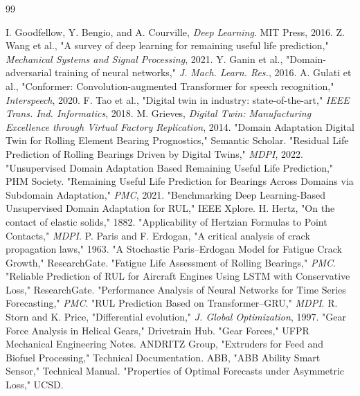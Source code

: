 \documentclass[journal,10pt,a4paper]{IEEEtran}
\begin{document}
\begin{thebibliography}{99}

 I. Goodfellow, Y. Bengio, and A. Courville, \emph{Deep Learning}. MIT Press, 2016.
 Z. Wang et al., "A survey of deep learning for remaining useful life prediction," \emph{Mechanical Systems and Signal Processing}, 2021.
 Y. Ganin et al., "Domain-adversarial training of neural networks," \emph{J. Mach. Learn. Res.}, 2016.
 A. Gulati et al., "Conformer: Convolution-augmented Transformer for speech recognition," \emph{Interspeech}, 2020.
 F. Tao et al., "Digital twin in industry: state-of-the-art," \emph{IEEE Trans. Ind. Informatics}, 2018.
 M. Grieves, \emph{Digital Twin: Manufacturing Excellence through Virtual Factory Replication}, 2014.
 "Domain Adaptation Digital Twin for Rolling Element Bearing Prognostics," Semantic Scholar.
 "Residual Life Prediction of Rolling Bearings Driven by Digital Twins," \emph{MDPI}, 2022.
 "Unsupervised Domain Adaptation Based Remaining Useful Life Prediction," PHM Society.
 "Remaining Useful Life Prediction for Bearings Across Domains via Subdomain Adaptation," \emph{PMC}, 2021.
 "Benchmarking Deep Learning-Based Unsupervised Domain Adaptation for RUL," IEEE Xplore.
 H. Hertz, "On the contact of elastic solids," 1882.
 "Applicability of Hertzian Formulas to Point Contacts," \emph{MDPI}.
 P. Paris and F. Erdogan, "A critical analysis of crack propagation laws," 1963.
 "A Stochastic Paris--Erdogan Model for Fatigue Crack Growth," ResearchGate.
 "Fatigue Life Assessment of Rolling Bearings," \emph{PMC}.
 "Reliable Prediction of RUL for Aircraft Engines Using LSTM with Conservative Loss," ResearchGate.
 "Performance Analysis of Neural Networks for Time Series Forecasting," \emph{PMC}.
 "RUL Prediction Based on Transformer--GRU," \emph{MDPI}.
 R. Storn and K. Price, "Differential evolution," \emph{J. Global Optimization}, 1997.
 "Gear Force Analysis in Helical Gears," Drivetrain Hub.
 "Gear Forces," UFPR Mechanical Engineering Notes.
 ANDRITZ Group, "Extruders for Feed and Biofuel Processing," Technical Documentation.
 ABB, "ABB Ability Smart Sensor," Technical Manual.
 "Properties of Optimal Forecasts under Asymmetric Loss," UCSD.

\end{thebibliography}
\end{document}
